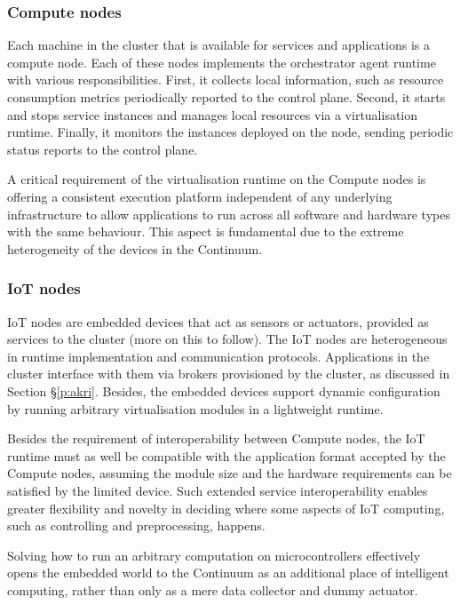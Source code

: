 \subsubsection{Compute nodes}

Each machine in the cluster that is available for services and applications is a compute node. Each of these nodes implements the orchestrator agent runtime with various responsibilities. First, it collects local information, such as resource consumption metrics periodically reported to the control plane. Second, it starts and stops service instances and manages local resources via a virtualisation runtime. Finally, it monitors the instances deployed on the node, sending periodic status reports to the control plane.

A critical requirement of the virtualisation runtime on the Compute nodes is offering a consistent execution platform independent of any underlying infrastructure to allow applications to run across all software and hardware types with the same behaviour. This aspect is fundamental due to the extreme heterogeneity of the devices in the Continuum.

\subsubsection{IoT nodes}

IoT nodes are embedded devices that act as sensors or actuators, provided as services to the cluster (more on this to follow). The IoT nodes are heterogeneous in runtime implementation and communication protocols. Applications in the cluster interface with them via brokers provisioned by the cluster, as discussed in Section §\ref{p:akri}. Besides, the embedded devices support dynamic configuration by running arbitrary virtualisation modules in a lightweight runtime.

Besides the requirement of interoperability between Compute nodes, the IoT runtime must as well be compatible with the application format accepted by the Compute nodes, assuming the module size and the hardware requirements can be satisfied by the limited device. Such extended service interoperability enables greater flexibility and novelty in deciding where some aspects of IoT computing, such as controlling and preprocessing, happens. 

Solving how to run an arbitrary computation on microcontrollers effectively opens the embedded world to the Continuum as an additional place of intelligent computing, rather than only as a mere data collector and dummy actuator.

